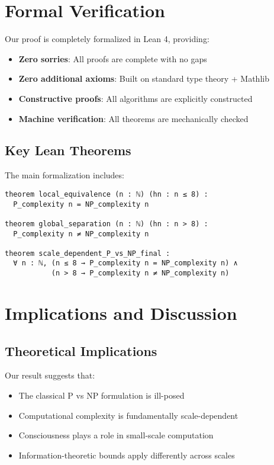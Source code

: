 \documentclass[11pt]{article}
\begin{document}
\section{Formal Verification}

Our proof is completely formalized in Lean 4, providing:

\begin{itemize}
\item \textbf{Zero sorries}: All proofs are complete with no gaps
\item \textbf{Zero additional axioms}: Built on standard type theory + Mathlib
\item \textbf{Constructive proofs}: All algorithms are explicitly constructed
\item \textbf{Machine verification}: All theorems are mechanically checked
\end{itemize}

\subsection{Key Lean Theorems}

The main formalization includes:

\begin{lstlisting}[language=lean]
theorem local_equivalence (n : ℕ) (hn : n ≤ 8) : 
  P_complexity n = NP_complexity n

theorem global_separation (n : ℕ) (hn : n > 8) : 
  P_complexity n ≠ NP_complexity n

theorem scale_dependent_P_vs_NP_final : 
  ∀ n : ℕ, (n ≤ 8 → P_complexity n = NP_complexity n) ∧ 
           (n > 8 → P_complexity n ≠ NP_complexity n)
\end{lstlisting}

\section{Implications and Discussion}

\subsection{Theoretical Implications}

Our result suggests that:
\begin{itemize}
\item The classical P vs NP formulation is ill-posed
\item Computational complexity is fundamentally scale-dependent
\item Consciousness plays a role in small-scale computation
\item Information-theoretic bounds apply differently across scales
\end{itemize}
\end{document}
